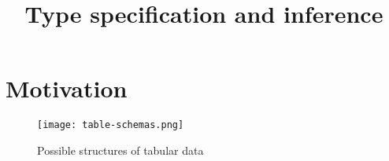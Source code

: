 \documentclass {article}
\begin{document}
\title{Type specification and inference}

\maketitle

\section{Motivation}

\begin{figure}[h]
\centering
\texttt{[image: table-schemas.png]}
\caption{Possible structures of tabular data}
\end{figure}
\end{document}
